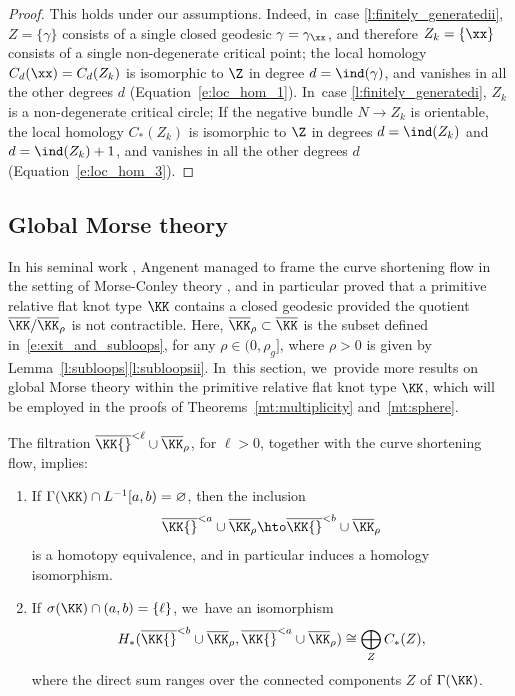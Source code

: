 \begin{proof}
This holds under our assumptions. Indeed, in~case \eqref{l:finitely_generatedii}, $Z=\{\gamma\}$ consists of a single closed geodesic $\gamma=\gamma_{\xx}$, and therefore $Z_k=\{\xx\}$ consists of a single non-degenerate critical point; the local homology $C_d(\xx)=C_d(Z_k)$ is isomorphic to $\Z$ in degree $d=\ind(\gamma)$, and vanishes in all the other degrees $d$ (Equation~\eqref{e:loc_hom_1}). In~case \eqref{l:finitely_generatedi}, $Z_k$ is a non-degenerate critical circle; If the negative bundle $N\to Z_k$ is orientable, the local homology $C_*(Z_k)$ is isomorphic to $\Z$ in degrees $d=\ind(Z_k)$ and $d=\ind(Z_k)+1$, and vanishes in all the other degrees $d$ (Equation~\eqref{e:loc_hom_3}).
\end{proof}

\subsection{Global Morse theory}\label{ss:global}

In his seminal work \cite[Th.\,1.1]{Angenent:2005aa}, Angenent managed to frame the curve shortening flow in the setting of Morse-Conley theory \cite{Conley:1978aa}, and in particular proved that a primitive relative flat knot type $\KK$ contains a closed geodesic provided the quotient $\overline\KK/\overline\KK_\rho$ is not contractible. Here, $\overline\KK_{\rho}\subset\overline\KK$ is the subset defined in~\eqref{e:exit_and_subloops}, for any $\rho\in(0,\rho_g]$, where $\rho>0$ is given by Lemma~\ref{l:subloops}\eqref{l:subloopsii}. In~this section, we~provide more results on global Morse theory within the primitive relative flat knot type $\KK$, which will be employed in the proofs of Theorems~\ref{mt:multiplicity} and~\ref{mt:sphere}.

The filtration
$\overline\KK{}^{<\ell}\cup\overline\KK_\rho$, for $\ell>0$,
together with the curve shortening flow, implies:
\begin{enumerate}
\item\label{ss:globali}
If $\Gamma(\KK)\cap L^{-1}[a,b)=\varnothing$, then the inclusion
\begin{align}
\label{e:inclusion_sublevel_sets_within_K}
\overline\KK{}^{<a}\cup\overline\KK_\rho
\hto
\overline\KK{}^{<b}\cup\overline\KK_\rho
\end{align}
is a homotopy equivalence, and in particular induces a homology isomorphism.

\item\label{ss:globalii}
If $\sigma(\KK)\cap (a,b)=\{\ell\}$, we~have an isomorphism
\begin{align*}
H_*(\overline\KK{}^{<b}\cup\overline\KK_\rho,\overline\KK{}^{<a}\cup\overline\KK_\rho)
\cong
\bigoplus_{Z}
C_*(Z),
\end{align*}
where the direct sum ranges over the connected components $Z$ of $\Gamma(\KK)$.
\end{enumerate}

